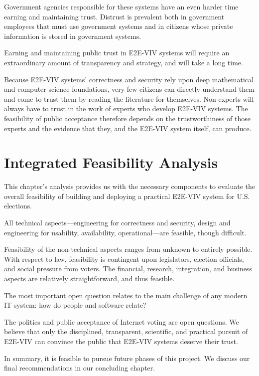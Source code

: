 Government agencies responsible for these systems have an even harder
time earning and maintaining trust.  Distrust is prevalent both in
government employees that must use government systems and in citizens
whose private information is stored in government systems.

Earning and maintaining public trust in E2E-VIV systems will require
an extraordinary amount of transparency and strategy, and will take a
long time.

Because E2E-VIV systems' correctness and security rely upon deep
mathematical and computer science foundations, very few citizens can
directly understand them and come to trust them by reading the
literature for themselves. Non-experts will always have to trust in
the work of experts who develop E2E-VIV systems. The feasibility of public
acceptance therefore depends on the trustworthiness of those experts
and the evidence that they, and the E2E-VIV system itself, can
produce.

\section{Integrated Feasibility Analysis}

This chapter's analysis provides us with the necessary components to
evaluate the overall feasibility of building and deploying a practical
E2E-VIV system for U.S. elections.

All technical aspects---engineering for correctness and security,
design and engineering for usability, availability, operational---are
feasible, though difficult.

Feasibility of the non-technical aspects ranges from unknown to
entirely possible.  With respect to law, feasibility is contingent
upon legislators, election officials, and social pressure from voters.
The financial, research, integration, and business aspects are
relatively straightforward, and thus feasible.

The most important open question relates to the main challenge of any
modern IT system: how do people and software relate?

The politics and public acceptance of Internet voting are open
questions. We believe that only the disciplined, transparent,
scientific, and practical pursuit of E2E-VIV can convince the public
that E2E-VIV systems deserve their trust.

In summary, it is feasible to pursue future phases of this project. We
discuss our final recommendations in our concluding chapter.
